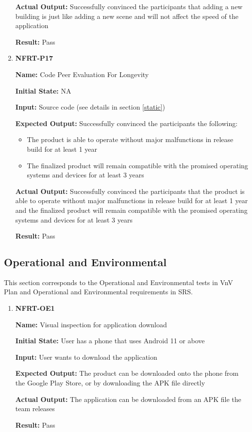 \documentclass[12pt, titlepage]{article}
\begin{document}
\begin{enumerate}
\textbf{Actual Output:} Successfully convinced the participants that adding a new building is just like adding a new scene and will not affect the speed of the application

\textbf{Result:} Pass

\item \textbf{NFRT-P17}

\textbf{Name:} Code Peer Evaluation For Longevity

\textbf{Initial State:} NA

\textbf{Input:} Source code (see details in section \ref{static})

\textbf{Expected Output:} Successfully convinced the participants the following:
\begin{itemize} 
  \item The product is able to operate without major malfunctions in release build for at least 1 year
  \item The finalized product will remain compatible with the promised operating systems and devices for at least 3 years
\end{itemize}

\textbf{Actual Output:} Successfully convinced the participants that the product is able to operate without major malfunctions in release build for at least 1 year and the finalized product will remain compatible with the promised operating systems and devices for at least 3 years

\textbf{Result:} Pass
\end{enumerate}
\subsection{Operational and Environmental}
This section corresponds to the Operational and Environmental tests in VnV Plan and Operational and Environmental requirements in SRS.
\begin{enumerate}
\item \textbf{NFRT-OE1}

\textbf{Name:} Visual inspection for application download

\textbf{Initial State:} User has a phone that uses Android 11 or above

\textbf{Input:} User wants to download the application

\textbf{Expected Output:} The product can be downloaded onto the phone from the Google Play Store, or by downloading the APK file directly

\textbf{Actual Output:} The application can be downloaded from an APK file the team releases

\textbf{Result:} Pass
\end{enumerate}
\end{document}
